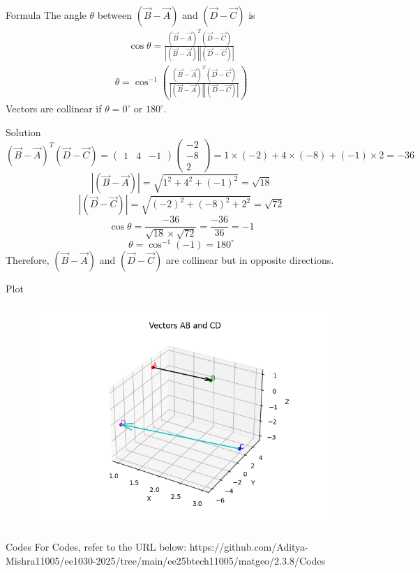 \documentclass{beamer}
\begin{document}
\begin{frame}{Formula}
The angle $\theta$ between $(\vec{B}-\vec{A})$ and $(\vec{D}-\vec{C})$ is
\begin{align}
\cos \theta = \frac{(\vec{B}-\vec{A})^T (\vec{D}-\vec{C})}
{|(\vec{B}-\vec{A})| |(\vec{D}-\vec{C})|}
\end{align}
\begin{align}
\theta = \cos^{-1}\left(
\frac{(\vec{B}-\vec{A})^T (\vec{D}-\vec{C})}
{|(\vec{B}-\vec{A})| |(\vec{D}-\vec{C})|}\right)
\end{align}
Vectors are collinear if $\theta = 0^\circ$ or $180^\circ$.
\end{frame}
\begin{frame}{Solution}
\[
(\vec{B}-\vec{A})^T (\vec{D}-\vec{C})
= \begin{pmatrix}1 & 4 & -1\end{pmatrix}
\begin{pmatrix}-2 \\ -8 \\ 2\end{pmatrix}
= 1\times(-2) + 4\times(-8) + (-1)\times 2 = -36
\]
\[
|(\vec{B}-\vec{A})| = \sqrt{1^2 + 4^2 + (-1)^2} = \sqrt{18}
\]
\[
|(\vec{D}-\vec{C})| = \sqrt{(-2)^2 + (-8)^2 + 2^2} = \sqrt{72}
\]
\[
\cos\theta = \frac{-36}{\sqrt{18} \times \sqrt{72}} = \frac{-36}{36} = -1
\]
\[
\theta = \cos^{-1}(-1) = 180^\circ
\]
Therefore, $(\vec{B}-\vec{A})$ and $(\vec{D}-\vec{C})$ are collinear but in opposite directions.
\end{frame}
\begin{frame}{Plot}
\begin{figure}
    \centering
    \includegraphics[width=0.8\columnwidth]{Figs/Figure.png}
\end{figure}
\end{frame}
\begin{frame}{Codes}
\centering
    For Codes, refer to the URL below:
    https://github.com/Aditya-Mishra11005/ee1030-2025/tree/main/ee25btech11005/matgeo/2.3.8/Codes
\end{frame}
\end{document}
